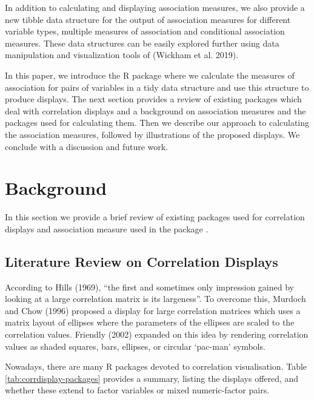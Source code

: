 In addition to calculating and displaying association measures, we also provide a new tibble data structure for the output of association measures for different variable types, multiple measures of association and conditional association measures. These data structures can be easily explored further using data manipulation and visualization tools of  (Wickham et al. 2019).

In this paper, we introduce the R package  where we calculate the measures of association for pairs of variables in a tidy data structure and use this structure to produce displays. The next section provides a review of existing packages which deal with correlation displays and a background on association measures and the packages used for calculating them. Then we describe our approach to calculating the association measures, followed by illustrations of the proposed displays. We conclude with a discussion and future work.

\hypertarget{background}{%
\section{Background}\label{background}}

In this section we provide a brief review of existing packages used for correlation displays and association measure used in the package .

\hypertarget{literature-review-on-correlation-displays}{%
\subsection{Literature Review on Correlation Displays}\label{literature-review-on-correlation-displays}}

According to Hills (1969), ``the first and sometimes only impression gained by looking at a large correlation matrix is its largeness''. To overcome this, Murdoch and Chow (1996) proposed a display for large correlation matrices which uses a matrix layout of ellipses where the parameters of the ellipses are scaled to the correlation values. Friendly (2002) expanded on this idea by rendering correlation values as shaded squares, bars, ellipses, or circular `pac-man' symbols.

Nowadays, there are many R packages devoted to correlation visualisation. Table \ref{tab:corrdisplay-packages} provides a summary, listing the displays offered, and whether these extend to factor variables or mixed numeric-factor pairs.


